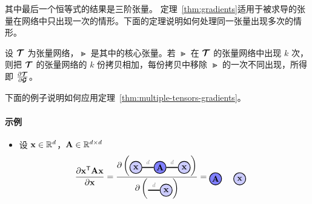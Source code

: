 其中最后一个恒等式的结果是三阶张量。
定理~\ref{thm:gradients}适用于被求导的张量在网络中只出现一次的情形。下面的定理说明如何处理同一张量出现多次的情形。
\begin{theorem}\label{thm:multiple-tensors-gradients}
    设 $\bm{\mathcal{T}}$ 为张量网络，$\Gt$ 是其中的核心张量。若 $\Gt$ 在 $\bm{\mathcal{T}}$ 的张量网络中出现 $k$ 次，则把 $\bm{\mathcal{T}}$ 的张量网络的 $k$ 份拷贝相加，每份拷贝中移除 $\Gt$ 的一次不同出现，所得即 $\frac{\partial\bm{\mathcal{T}}}{\partial\bm{\mathcal{G}}}$。
\end{theorem}
下面的例子说明如何应用定理~\ref{thm:multiple-tensors-gradients}。
\paragraph{示例}
\begin{itemize}
    \item 设 $\mathbf{x}\in\mathbb{R}^{d}$，$\mathbf{A}\in\mathbb{R}^{d\times d}$
    \begin{align*}
    \frac{\partial \xb^\ts\Ab\xb}{\partial\xb}
=
    \frac{\partial\left(\begin{tikzpicture}[baseline=-0.1ex]
    \tikzset{tensor/.style = {minimum size = 0.5cm,shape = circle,thick,draw=black,inner sep = 0pt}, edge/.style = {thick,line width=.4mm},every loop/.style={}}
    \def\x{6}
    \def\y{0}
    \node[tensor,fill=blue!50!white] (A) at (\x+1,\y) {$\Ab$};
    \node[tensor,fill=blue!20!white] (x) at (\x+2,\y) {$\xb$};
    \node[tensor,fill=blue!20!white] (xprime) at 
    (\x,\y){$\xb$};
    \draw[edge] (A) -- (x)node [midway, above] {\scalebox{0.7}{\dimcolor{$d$}}};
    \draw[edge] (A) -- (xprime)node [midway, above] {\scalebox{0.7}{\dimcolor{$d$}}};
    \end{tikzpicture}\right)}{\partial\left(\begin{tikzpicture}[baseline=-0.1ex]
    \tikzset{tensor/.style = {minimum size = 0.5cm,shape = circle,thick,draw=black,inner sep = 0pt}, edge/.style = {thick,line width=.4mm},every loop/.style={}}
    \def\x{6}
    \def\y{0}
    \node[tensor,fill=blue!20!white] (x) at (\x,\y) {$\xb$};
    \draw[edge] (x) -- (\x-0.75,\y)node [midway, above] {\scalebox{0.7}{\dimcolor{$d$}}};
    \end{tikzpicture}\right)}
&=
    \begin{tikzpicture}[baseline=-0.1ex]
    \tikzset{tensor/.style = {minimum size = 0.5cm,shape = circle,thick,draw=black,inner sep = 0pt}, edge/.style = {thick,line width=.4mm},every loop/.style={}}
    \def\x{6}
    \def\y{0}
    \node[tensor,fill=blue!50!white] (A) at (\x+1,\y) {$\Ab$};
    \node[tensor,fill=blue!20!white] (x) at (\x+2,\y) {$\xb$};

\end{tikzpicture}
\end{align*}
\end{itemize}
